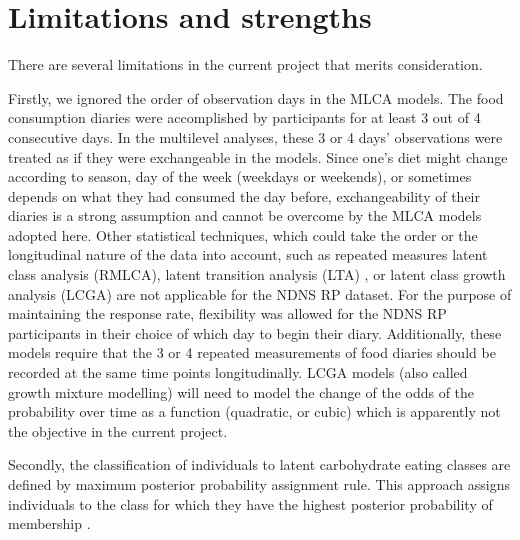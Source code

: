 










\section{Limitations and strengths}

There are several limitations in the current project that merits consideration.  

Firstly, we ignored the order of observation days in the MLCA models. The food consumption diaries were accomplished by participants for at least 3 out of 4 consecutive days. In the multilevel analyses, these 3 or 4 days' observations were treated as if they were exchangeable in the models. Since one's diet might change according to season, day of the week (weekdays or weekends), or sometimes depends on what they had consumed the day before, exchangeability of their diaries is a strong assumption and cannot be overcome by the MLCA models adopted here. Other statistical techniques, which could take the order or the longitudinal nature of the data into account, such as repeated measures latent class analysis (RMLCA), latent transition analysis (LTA) \parencite{collins2010latent}, or latent class growth analysis (LCGA) \parencite{davidian2008growth,jung2008introduction,andruff2009latent} are not applicable for the NDNS RP dataset. For the purpose of maintaining the response rate, flexibility was allowed for the NDNS RP participants in their choice of which day to begin their diary.  Additionally, these models require that the 3 or 4 repeated measurements of food diaries should be recorded at the same time points longitudinally. LCGA models (also called growth mixture modelling) will need to model the change of the odds of the probability over time as a function (quadratic, or cubic) which is apparently not the objective in the current project. 

Secondly, the classification of individuals to latent carbohydrate eating classes are defined by maximum posterior probability assignment rule. This approach assigns individuals to the class for which they have the highest posterior probability of membership \parencite{nagin2005group}. 

